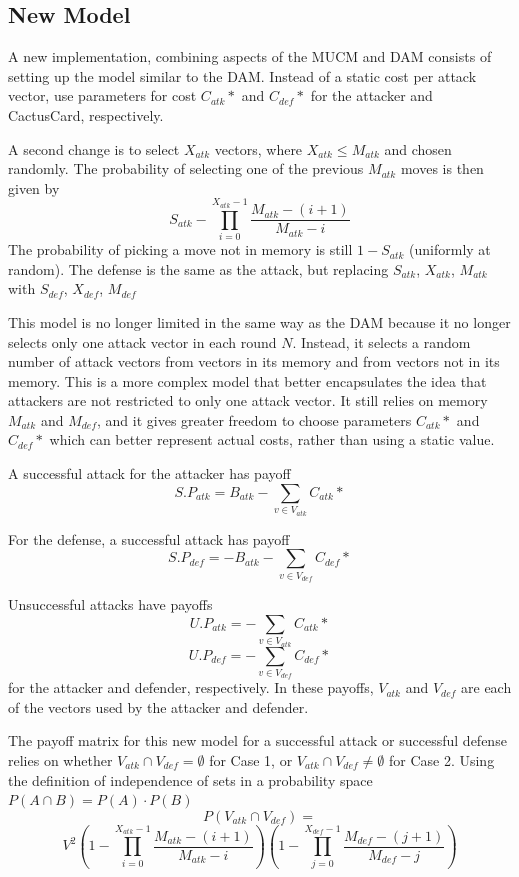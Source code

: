 \documentclass[11pt,journal]{IEEEtran}
\begin{document}
\subsection{New Model}
A new implementation, combining aspects of the MUCM and DAM consists of setting up the model similar to the DAM. Instead of a static cost per attack vector, use parameters for cost $C_{atk}{*}$ and $C_{def}{*}$ for the attacker and CactusCard, respectively.
\par
A second change is to select $X_{atk}$ vectors, where $X_{atk} \leq M_{atk}$ and chosen randomly. The probability of selecting one of the previous $M_{atk}$ moves is then given by
\[S_{atk} - \prod_{i=0}^{X_{atk}-1} \frac{M_{atk}-(i+1)}{M_{atk}-i}\]
The probability of picking a move not in memory is still $1-S_{atk}$ (uniformly at random). The defense is the same as the attack, but replacing $S_{atk}$, $X_{atk}$, $M_{atk}$ with $S_{def}$, $X_{def}$, $M_{def}$
\par
This model is no longer limited in the same way as the DAM because it no longer selects only one attack vector in each round $N$. Instead, it selects a random number of attack vectors from vectors in its memory and from vectors not in its memory. This is a more complex model that better encapsulates the idea that attackers are not restricted to only one attack vector. It still relies on memory $M_{atk}$ and $M_{def}$, and it gives greater freedom to choose parameters $C_{atk}*$ and $C_{def}*$ which can better represent actual costs, rather than using a static value.
\par
A successful attack for the attacker has payoff \[S.P_{atk} = B_{atk} -\sum_{v \in V_{atk}} C_{atk}*\] 
\par
For the defense, a successful attack has payoff \[S.P_{def} = -B_{atk} -\sum_{v \in V_{def}} C_{def}*\]
\par
Unsuccessful attacks have payoffs \[U.P_{atk} = -\sum_{v \in V_{atk}} C_{atk}*\] \[U.P_{def} = -\sum_{v \in V_{def}} C_{def}*\] for the attacker and defender, respectively. In these payoffs, $V_{atk}$ and $V_{def}$ are each of the vectors used by the attacker and defender.
\par
The payoff matrix for this new model for a successful attack or successful defense relies on whether $V_{atk} \cap V_{def} = \emptyset$ for Case 1, or $V_{atk} \cap V_{def} \neq \emptyset$ for Case 2. Using the definition of independence of sets in a probability space $P(A \cap B) = P(A)\cdot P(B)$
\[P( V_{atk} \cap V_{def}) =\]
\[ V^2 ( 1 - \prod_{i=0}^{X_{atk}-1} \frac{M_{atk}-(i+1)}{M_{atk}-i}) ( 1 - \prod_{j=0}^{X_{def}-1} \frac{M_{def}-(j+1)}{M_{def}-j}) \]
\end{document}
